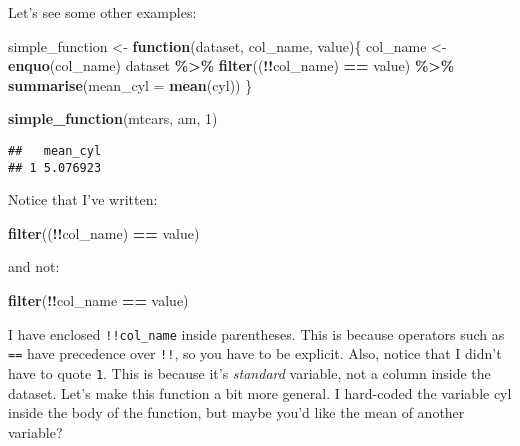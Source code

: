 \documentclass[
]{article}
\newenvironment{Shaded}{\begin{snugshade}}{\end{snugshade}}
\newcommand{\ControlFlowTok}[1]{\textcolor[rgb]{0.13,0.29,0.53}{\textbf{#1}}}
\newcommand{\DataTypeTok}[1]{\textcolor[rgb]{0.13,0.29,0.53}{#1}}
\newcommand{\DecValTok}[1]{\textcolor[rgb]{0.00,0.00,0.81}{#1}}
\newcommand{\KeywordTok}[1]{\textcolor[rgb]{0.13,0.29,0.53}{\textbf{#1}}}
\newcommand{\NormalTok}[1]{#1}
\newcommand{\OperatorTok}[1]{\textcolor[rgb]{0.81,0.36,0.00}{\textbf{#1}}}
\newcommand{\StringTok}[1]{\textcolor[rgb]{0.31,0.60,0.02}{#1}}
\begin{document}
Let's see some other examples:

\begin{Shaded}
\begin{Highlighting}[]
\NormalTok{simple\_function \textless{}{-}}\StringTok{ }\ControlFlowTok{function}\NormalTok{(dataset, col\_name, value)\{}
\NormalTok{  col\_name \textless{}{-}}\StringTok{ }\KeywordTok{enquo}\NormalTok{(col\_name)}
\NormalTok{  dataset }\OperatorTok{\%\textgreater{}\%}
\StringTok{    }\KeywordTok{filter}\NormalTok{((}\OperatorTok{!!}\NormalTok{col\_name) }\OperatorTok{==}\StringTok{ }\NormalTok{value) }\OperatorTok{\%\textgreater{}\%}
\StringTok{    }\KeywordTok{summarise}\NormalTok{(}\DataTypeTok{mean\_cyl =} \KeywordTok{mean}\NormalTok{(cyl))}
\NormalTok{\}}


\KeywordTok{simple\_function}\NormalTok{(mtcars, am, }\DecValTok{1}\NormalTok{)}
\end{Highlighting}
\end{Shaded}

\begin{verbatim}
##   mean_cyl
## 1 5.076923
\end{verbatim}

Notice that I've written:

\begin{Shaded}
\begin{Highlighting}[]
\KeywordTok{filter}\NormalTok{((}\OperatorTok{!!}\NormalTok{col\_name) }\OperatorTok{==}\StringTok{ }\NormalTok{value)}
\end{Highlighting}
\end{Shaded}

and not:

\begin{Shaded}
\begin{Highlighting}[]
\KeywordTok{filter}\NormalTok{(}\OperatorTok{!!}\NormalTok{col\_name }\OperatorTok{==}\StringTok{ }\NormalTok{value)}
\end{Highlighting}
\end{Shaded}

I have enclosed \texttt{!!col\_name} inside parentheses. This is because operators such as \texttt{==} have
precedence over \texttt{!!}, so you have to be explicit. Also, notice that I didn't have to quote \texttt{1}.
This is because it's \emph{standard} variable, not a column inside the dataset. Let's make this function
a bit more general. I hard-coded the variable cyl inside the body of the function, but maybe you'd
like the mean of another variable?
\end{document}
